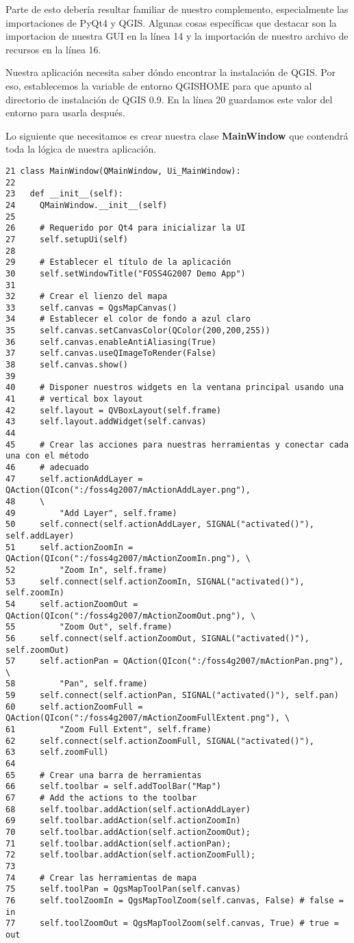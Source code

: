 Parte de esto debería resultar familiar de nuestro complemento, especialmente las importaciones de PyQt4 y
QGIS. Algunas cosas específicas que destacar son la importacion de nuestra GUI en la línea 14 y la
importación de nuestro archivo de recursos en la línea 16.

Nuestra aplicación necesita saber dóndo encontrar la instalación de QGIS. Por eso, establecemos la
variable de entorno QGISHOME para que apunto al directorio de instalación de QGIS 0.9. En la línea
20 guardamos este valor del entorno para usarla después.

Lo siguiente que necesitamos es crear nuestra clase \textbf{MainWindow} que contendrá toda la lógica de
nuestra aplicación.
\begin{verbatim}
21 class MainWindow(QMainWindow, Ui_MainWindow):
22 
23   def __init__(self):
24     QMainWindow.__init__(self)
25 
26     # Requerido por Qt4 para inicializar la UI
27     self.setupUi(self)
28 
29     # Establecer el título de la aplicación
30     self.setWindowTitle("FOSS4G2007 Demo App")
31 
32     # Crear el lienzo del mapa
33     self.canvas = QgsMapCanvas()
34     # Establecer el color de fondo a azul claro
35     self.canvas.setCanvasColor(QColor(200,200,255))
36     self.canvas.enableAntiAliasing(True)
37     self.canvas.useQImageToRender(False)
38     self.canvas.show()
39 
40     # Disponer nuestros widgets en la ventana principal usando una 
41     # vertical box layout
42     self.layout = QVBoxLayout(self.frame)
43     self.layout.addWidget(self.canvas)
44 
45     # Crear las acciones para nuestras herramientas y conectar cada una con el método
46     # adecuado
47     self.actionAddLayer = QAction(QIcon(":/foss4g2007/mActionAddLayer.png"),
48     \
49         "Add Layer", self.frame)
50     self.connect(self.actionAddLayer, SIGNAL("activated()"), self.addLayer)
51     self.actionZoomIn = QAction(QIcon(":/foss4g2007/mActionZoomIn.png"), \
52         "Zoom In", self.frame)
53     self.connect(self.actionZoomIn, SIGNAL("activated()"), self.zoomIn)
54     self.actionZoomOut = QAction(QIcon(":/foss4g2007/mActionZoomOut.png"), \
55         "Zoom Out", self.frame)
56     self.connect(self.actionZoomOut, SIGNAL("activated()"), self.zoomOut)
57     self.actionPan = QAction(QIcon(":/foss4g2007/mActionPan.png"), \
58         "Pan", self.frame)
59     self.connect(self.actionPan, SIGNAL("activated()"), self.pan)
60     self.actionZoomFull = QAction(QIcon(":/foss4g2007/mActionZoomFullExtent.png"), \
61         "Zoom Full Extent", self.frame)
62     self.connect(self.actionZoomFull, SIGNAL("activated()"),
63     self.zoomFull)
64 
65     # Crear una barra de herramientas
66     self.toolbar = self.addToolBar("Map")
67     # Add the actions to the toolbar
68     self.toolbar.addAction(self.actionAddLayer)
69     self.toolbar.addAction(self.actionZoomIn)
70     self.toolbar.addAction(self.actionZoomOut);
71     self.toolbar.addAction(self.actionPan);
72     self.toolbar.addAction(self.actionZoomFull);
73 
74     # Crear las herramientas de mapa
75     self.toolPan = QgsMapToolPan(self.canvas)
76     self.toolZoomIn = QgsMapToolZoom(self.canvas, False) # false = in
77     self.toolZoomOut = QgsMapToolZoom(self.canvas, True) # true = out
\end{verbatim}

